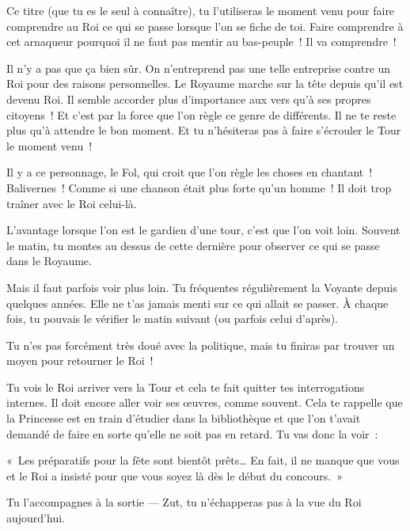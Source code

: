 {{Ce titre (que tu es le seul à connaître), tu l’utiliseras le moment venu pour faire comprendre au Roi ce qui se passe lorsque l’on se fiche de toi.
Faire comprendre à cet arnaqueur pourquoi il ne faut pas mentir au bas-peuple~!
Il va comprendre~!

Il n’y a pas que ça bien sûr.
On n’entreprend pas une telle entreprise contre un Roi pour des raisons personnelles.
Le Royaume marche sur la tête depuis qu’il est devenu Roi.
Il semble accorder plus d’importance aux vers qu’à ses propres citoyens~!
Et c’est par la force que l’on règle ce genre de différents.
Il ne te reste plus qu’à attendre le bon moment.
Et tu n’hésiteras pas à faire s’écrouler le Tour le moment venu~!

Il y a ce personnage, le Fol, qui croit que l’on règle les choses en chantant~!
Balivernes~!
Comme si une chanson était plus forte qu’un homme~!
Il doit trop traîner avec le Roi celui-là.

L’avantage lorsque l’on est le gardien d’une tour, c’est que l’on voit loin.
Souvent le matin, tu montes au dessus de cette dernière pour observer ce qui se passe dans le Royaume.

Mais il faut parfois voir plus loin.
Tu fréquentes régulièrement la Voyante depuis quelques années.
Elle ne t’as jamais menti sur ce qui allait se passer.
À chaque fois, tu pouvais le vérifier le matin suivant (ou parfois celui d’après).

Tu n’es pas forcément très doué avec la politique, mais tu finiras par trouver un moyen pour retourner le Roi~!

Tu vois le Roi arriver vers la Tour et cela te fait quitter tes interrogations internes.
Il doit encore aller voir ses œuvres, comme souvent.
Cela te rappelle que la Princesse est en train d’étudier dans la bibliothèque et que l’on t’avait demandé de faire en sorte qu’elle ne soit pas en retard.
Tu vas donc la voir~:

«~Les préparatifs pour la fête sont bientôt prêts…  En fait, il ne manque que vous et le Roi a insisté pour que vous soyez là dès le début du concours.~»

Tu l’accompagnes à la sortie — Zut, tu n’échapperas pas à la vue du Roi aujourd’hui.
}

}

